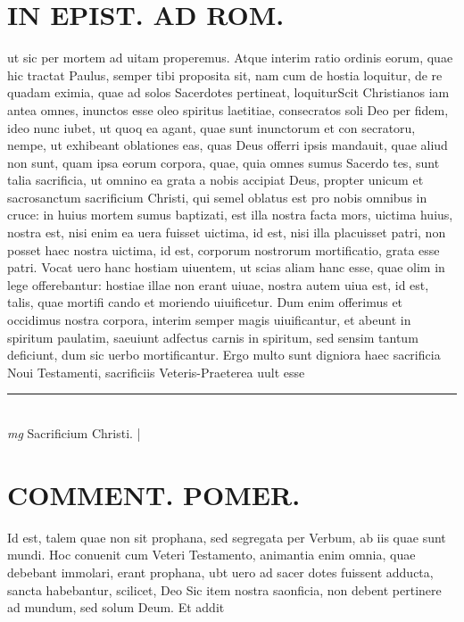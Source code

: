 \documentclass{article}
\begin{document}
\begin{pages}
\section*{IN EPIST. AD ROM.  }
\marginpar{[ p.140 ]}\pstart ut sic per mortem ad uitam properemus. Atque interim ratio ordinis eorum, quae hic tractat Paulus, semper tibi proposita sit, nam cum de hostia loquitur, de re quadam eximia, quae ad solos Sacerdotes pertineat, loquiturScit Christianos iam antea omnes, inunctos esse oleo spiritus laetitiae, consecratos soli Deo per fidem, ideo nunc iubet, ut quoq ea agant, quae sunt inunctorum et con secratoru, nempe, ut exhibeant oblationes eas, quas Deus offerri ipsis mandauit, quae aliud non sunt, quam ipsa eorum corpora, quae, quia omnes sumus Sacerdo tes, sunt talia sacrificia, ut omnino ea grata a nobis accipiat Deus, propter unicum et sacrosanctum sacrificium Christi, qui semel oblatus est pro nobis omnibus in cruce: in huius mortem sumus baptizati, est illa nostra facta mors, uictima huius, nostra est, nisi enim ea uera fuisset uictima, id est, nisi illa placuisset patri, non posset haec nostra uictima, id est, corporum nostrorum mortificatio, grata esse patri. Vocat uero hanc hostiam uiuentem, ut scias aliam hanc esse, quae olim in lege offerebantur: hostiae illae non erant uiuae, nostra autem uiua est, id est, talis, quae mortifi cando et moriendo uiuificetur. Dum enim offerimus et occidimus nostra corpora, interim semper magis uiuificantur, et abeunt in spiritum paulatim, saeuiunt adfectus carnis in spiritum, sed sensim tantum deficiunt, dum sic uerbo mortificantur. Ergo multo sunt digniora haec sacrificia Noui Testamenti, sacrificiis Veteris-Praeterea uult esse  \pend
\vspace{0.5cm}\noindent
\vspace{0.2cm}\rule{1cm}{0.2pt}\\ 
\hspace{0.2cm}\textit{mg}
\footnotesize Sacrificium Christi.  
\normalsize| 
\section*{COMMENT. POMER.  }\pstart Id est, talem quae non sit prophana, sed segregata per Verbum, ab iis quae sunt mundi. Hoc conuenit cum Veteri Testamento, animantia enim omnia, quae debebant immolari, erant prophana, ubt uero ad sacer dotes fuissent adducta, sancta habebantur, scilicet, Deo Sic item nostra saonficia, non debent pertinere ad mundum, sed solum Deum. Et addit  \pend
{}
{}

\end{pages}
\end{document}
